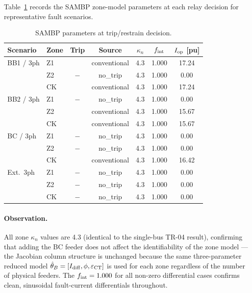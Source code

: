\documentclass[12pt,a4paper]{article}
\newcommand{\kn}{\kappa_n}
\newcommand{\fint}{f_{\rm int}}
\newcommand{\Iop}{I_{\rm op}}
\newcommand{\cmark}{\ding{51}}
\begin{document}
Table~\ref{tab:sambp_params} records the SAMBP zone-model parameters at
each relay decision for representative fault scenarios.

\begin{table}[H]
  \centering
  \caption{SAMBP parameters at trip/restrain decision.}
  \label{tab:sambp_params}
  \small
  \begin{tabular}{llccccc}
    \toprule
    Scenario & Zone & Trip & Source & $\kn$ & $\fint$ & $\Iop$ [pu] \\
    \midrule
    BB1 / 3ph  & Z1  & \cmark & conventional & 4.3 & 1.000 & 17.24 \\
               & Z2  & $-$    & no\_trip     & 4.3 & 1.000 &  0.00 \\
               & CK  & \cmark & conventional & 4.3 & 1.000 & 17.24 \\
    BB2 / 3ph  & Z1  & $-$    & no\_trip     & 4.3 & 1.000 &  0.00 \\
               & Z2  & \cmark & conventional & 4.3 & 1.000 & 15.67 \\
               & CK  & \cmark & conventional & 4.3 & 1.000 & 15.67 \\
    BC / 3ph   & Z1  & $-$    & no\_trip     & 4.3 & 1.000 &  0.00 \\
               & Z2  & $-$    & no\_trip     & 4.3 & 1.000 &  0.00 \\
               & CK  & \cmark & conventional & 4.3 & 1.000 & 16.42 \\
    Ext.~3ph   & Z1  & $-$    & no\_trip     & 4.3 & 1.000 &  0.00 \\
               & Z2  & $-$    & no\_trip     & 4.3 & 1.000 &  0.00 \\
               & CK  & $-$    & no\_trip     & 4.3 & 1.000 &  0.00 \\
    \bottomrule
  \end{tabular}
\end{table}

\paragraph{Observation.}
All zone $\kn$ values are 4.3 (identical to the single-bus TR-04
result), confirming that adding the BC feeder does not affect the
identifiability of the zone model — the Jacobian column structure
is unchanged because the same three-parameter reduced model
$\hat\theta_B = [I_{\rm diff}, \phi, \varepsilon_{\rm CT}]$ is used
for each zone regardless of the number of physical feeders.
The $\fint = 1.000$ for all non-zero differential cases confirms
clean, sinusoidal fault-current differentials throughout.
\end{document}
